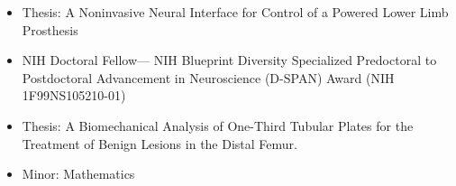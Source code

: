     \vspace{-3pt}
    \begin{itemize}
    \item Thesis: A Noninvasive Neural Interface for Control of a Powered Lower Limb Prosthesis
    \item  \color{heading} NIH Doctoral Fellow---\normalsize \color{body} NIH Blueprint Diversity Specialized Predoctoral to Postdoctoral Advancement in Neuroscience (D-SPAN) Award (NIH 1F99NS105210-01) \href{https://projectreporter.nih.gov/project_info_description.cfm?aid=9470585&icde=37206091}{\linkicon} 
    \end{itemize}
    \smallskip
    
    \vspace{-3pt}
    \begin{itemize}
    \item Thesis: A Biomechanical Analysis of One-Third Tubular Plates for the Treatment of Benign Lesions in the Distal Femur. \href{http://repository.unm.edu/handle/1928/25732}{\linkicon} %
    \end{itemize}
    
    \smallskip
    
    \vspace{-3pt}
    \begin{itemize}
    \item Minor: Mathematics
    \end{itemize}